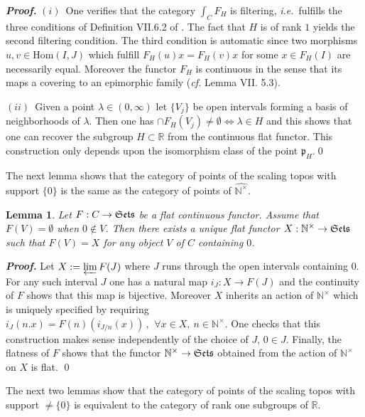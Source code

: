 \documentclass{elsart3-1}
\newtheorem{lemma}[theorem]{Lemma}
\def\Hom{{\rm Hom}}
\def\N{{\mathbb N}}
\def\R{{\mathbb R}}
\def\qqq{\,,\,~\forall}
\newcommand{\ie}{{\it i.e.\/}\ }
\newcommand{\cf}{{\it cf.}}
\def\Hom {{\mbox{Hom}}}
\def\ffp{\mathfrak{p}}
\def\Se{\frak{ Sets}}
\def\nt{\N^{\times}}
\def\wnt{{\widehat{\N^{\times}}}}
\def\vsp{\vspace{.05in}}
\begin{document}
{\it\bf Proof.} $(i)$~One verifies that the category $\int_C F_H$ is filtering, \ie fulfills the three conditions of Definition VII.6.2 of \cite{MM}. The fact that $H$ is of rank $1$ yields the second filtering condition. The third condition is automatic since two morphisms $u,v\in \Hom(I,J)$ which fulfill $F_H(u)x=F_H(v)x$ for some $x\in F_H(I)$ are necessarily equal. Moreover the functor $F_H$ is continuous in the sense that its maps a covering  to an epimorphic family (\cf \cite{MM} Lemma VII. 5.3).

$(ii)$~Given a point $\lambda\in (0,\infty)$ let $\{V_j\}$ be open intervals forming a basis of neighborhoods of $\lambda$. Then one has
$
\cap F_H(V_j)\neq \emptyset \iff \lambda \in H
$
and this shows that one can recover the subgroup $H\subset \R$ from the continuous flat functor. This construction only depends upon the isomorphism class of the point $\ffp_H$.\qed
\vsp

The next lemma shows that the category of points of the scaling topos  with support $\{0\}$ is the same as the category of points of $\wnt$.\vsp

\begin{lemma}\label{case1} Let $F:C\to \Se$ be a flat continuous functor.
Assume  that  $F(V)=\emptyset$ when $0\notin V$. Then there exists a unique flat functor $X:\nt\to \Se$ such that $F(V)=X$ for any object $V$ of $C$ containing $0$.
\end{lemma}
{\it\bf Proof.}  Let  
$X:=\varprojlim F(J)$ where $J$ runs through the open intervals containing $0$. For any such interval $J$ one has a natural map $i_J:X\to F(J)$ and the continuity of $F$ shows that this map is bijective. Moreover $X$ inherits an action of $\nt$ which is uniquely specified by requiring \raggedbottom
$
i_J(n.x)=F(n)(i_{J/n}(x))\qqq x\in X, \  n\in \nt.
$
One checks that this construction makes sense independently of the choice of $J$, $0\in J$. Finally, the flatness of  
$F$ shows that the functor $\nt\to\Se$ obtained from the action of $\nt$ on $X$ is flat. \qed
\vsp

The next two lemmas show that the category of points of the scaling topos  with support $\neq \{0\}$ is equivalent to the category of rank one subgroups of $\R$.\vsp
\end{document}
